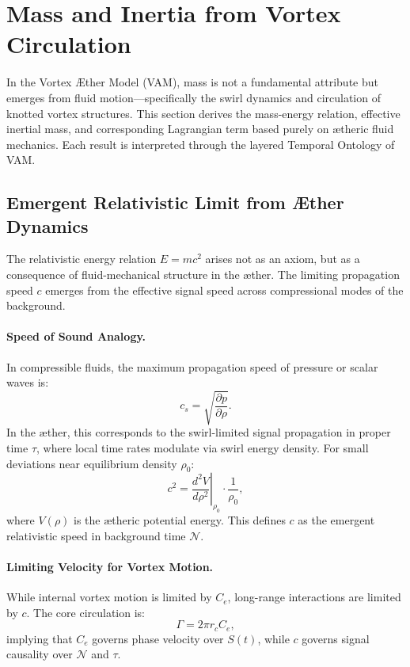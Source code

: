 \section{Mass and Inertia from Vortex Circulation}

In the Vortex \AE{}ther Model (VAM), mass is not a fundamental attribute but emerges from fluid motion—specifically the swirl dynamics and circulation of knotted vortex structures. This section derives the mass-energy relation, effective inertial mass, and corresponding Lagrangian term based purely on \ae{}theric fluid mechanics. Each result is interpreted through the layered Temporal Ontology of VAM.

\subsection{Emergent Relativistic Limit from \AE{}ther Dynamics}

The relativistic energy relation \( E = mc^2 \) arises not as an axiom, but as a consequence of fluid-mechanical structure in the \ae{}ther. The limiting propagation speed \( c \) emerges from the effective signal speed across compressional modes of the background.

\paragraph{Speed of Sound Analogy.}
In compressible fluids, the maximum propagation speed of pressure or scalar waves is:
\[
    c_s = \sqrt{\frac{\partial p}{\partial \rho}}.
\]
In the \ae{}ther, this corresponds to the swirl-limited signal propagation in proper time \( \tau \), where local time rates modulate via swirl energy density. For small deviations near equilibrium density \( \rho_0 \):
\[
    c^2 = \left.\frac{d^2 V}{d\rho^2} \right|_{\rho_0} \cdot \frac{1}{\rho_0},
\]
where \( V(\rho) \) is the \ae{}theric potential energy. This defines \( c \) as the emergent relativistic speed in background time \( \mathcal{N} \).

\paragraph{Limiting Velocity for Vortex Motion.}
While internal vortex motion is limited by \( C_e \), long-range interactions are limited by \( c \). The core circulation is:
\[
    \Gamma = 2\pi r_c C_e,
\]
implying that \( C_e \) governs phase velocity over $S(t)$, while \( c \) governs signal causality over $\mathcal{N}$ and $\tau$.

